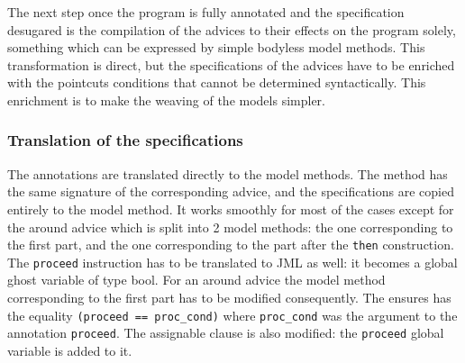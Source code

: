 The next step once the program is fully annotated and the specification desugared is the compilation of the
advices to their effects on the program solely, something  which can be expressed by simple bodyless model 
methods.
This transformation is direct, but the specifications of the advices have to be
 enriched with the pointcuts conditions that cannot be determined syntactically.
This enrichment is to make the weaving of the models simpler.

\subsubsection{Translation of the specifications}
The annotations are translated directly to the model methods. The method has the same signature
 of the corresponding advice, and the specifications are copied entirely to the model method. It works smoothly
for most of the cases except for the around advice which is split into 2 model methods: the one corresponding
to the first part, and the one corresponding to the part after the {\tt then} construction. 
The {\tt proceed} instruction has to be translated to JML as well: it becomes a global 
ghost variable of type bool.
For an around advice the model method corresponding to the first part has to be modified consequently.
The ensures has the equality {\tt (proceed == proc\_cond)} where {\tt proc\_cond} was the argument 
to the annotation {\tt proceed}. The assignable clause is also modified: the {\tt proceed} global variable is 
added to it.
